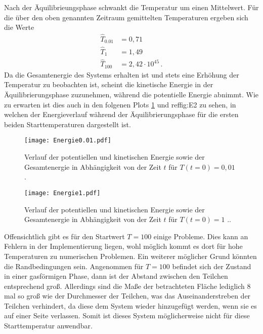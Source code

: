 Nach der Äquilibrieungsphase schwankt die Temperatur um einen Mittelwert.
Für die über den oben genannten Zeitraum gemittelten Temperaturen ergeben sich die Werte
\begin{align*}
\hat{T}_{0.01} &= 0,71 \\
\hat{T}_{1} &=1,49  \\
\hat{T}_{100} &= 2,42 \cdot 10^{45} \, .
\end{align*}
Da die Gesamtenergie des Systems erhalten ist und stets eine Erhöhung der Temperatur zu beobachten ist, scheint die kinetische Energie in der Äquilibrierungsphase zuzunehmen, während die potentielle Energie abnimmt.
Wie zu erwarten ist dies auch in den folgenen Plots \ref{fig:E1} und ref{fig:E2} zu sehen, in welchen der Energieverlauf während der Äquilibrierungsphase für die ersten beiden Starttemperaturen dargestellt ist.
\FloatBarrier
\begin{figure}[H]
    \centering
    \texttt{[image: Energie0.01.pdf]}
    \caption{Verlauf der potentiellen und kinetischen Energie sowie der Gesamtenergie in Abhängigkeit von der Zeit $t$ für $T(t=0)=0,01$ .}
    \label{fig:E1}
\end{figure}
\FloatBarrier
\noindent
\FloatBarrier
\begin{figure}[H]
    \centering
    \texttt{[image: Energie1.pdf]}
    \caption{Verlauf der potentiellen und kinetischen Energie sowie der Gesamtenergie in Abhängigkeit von der Zeit $t$ für $T(t=0)=1$ ..}
    \label{fig:E2}
\end{figure}
\FloatBarrier
\noindent
Offensichtlich gibt es für den Startwert $T=100$ einige Probleme. 
Dies kann an Fehlern in der Implementierung liegen, wohl möglich kommt es dort für hohe Temperaturen zu numerischen Problemen.
Ein weiterer möglicher Grund könnten die Randbedingungen sein. 
Angenommen für $T=100$ befindet sich der Zustand in einer gasförmigen Phase, dann ist der Abstand zwischen den Teilchen entsprechend groß.
Allerdings sind die Maße der betrachteten Fläche lediglich 8 mal so groß wie der Durchmesser der Teilchen, was das Auseinanderstreben der Teilchen verhindert, da diese dem System wieder hinzugefügt werden, wenn sie es auf einer Seite verlassen.
Somit ist dieses System möglicherweise nicht für diese Starttemperatur anwendbar.


